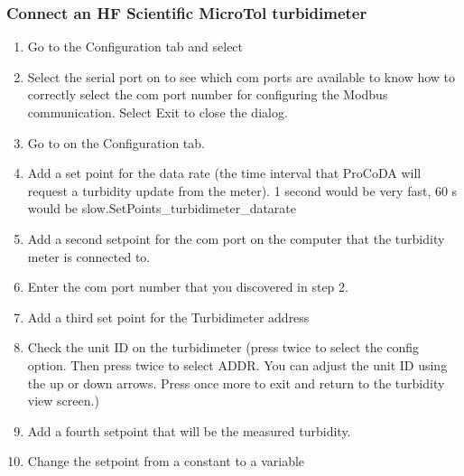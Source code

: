 \documentclass[letterpaper,10pt,english]{sphinxmanual}
\begin{document}
\subsubsection{Connect an HF Scientific MicroTol turbidimeter}
\label{\detokenize{ProCoDA/ProCoDA:connect-an-hf-scientific-microtol-turbidimeter}}\begin{enumerate}
\item {} 
Go to the Configuration tab and select 

\item {} 
Select the serial port on  to see which com ports are available to know how to correctly select the com port number for configuring the Modbus communication. Select Exit to close the dialog.

\item {} 
Go to  on the Configuration tab.

\item {} 
Add a set point for the data rate (the time interval that ProCoDA will request a turbidity update from the meter). 1 second would be very fast, 60 s would be slow.\textbar{}SetPoints\_turbidimeter\_datarate\textbar{}

\item {} 
Add a second setpoint for the com port on the computer that the turbidity meter is connected to. 

\item {} 
Enter the com port number that you discovered in step 2.

\item {} 
Add a third set point for the Turbidimeter address 

\item {} 
Check the unit ID on the turbidimeter (press  twice to select the config option. Then press  twice to select ADDR. You can adjust the unit ID using the up or down arrows. Press  once more to exit and return to the turbidity view screen.)

\item {} 
Add a fourth setpoint that will be the measured turbidity.

\item {} 
Change the setpoint from a constant to a variable


\end{enumerate}
\end{document}
